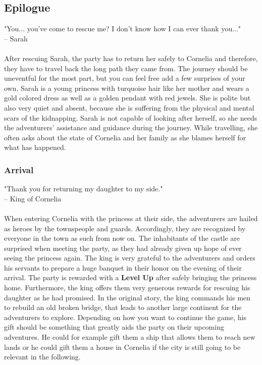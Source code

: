 \subsection*{Epilogue}
"You... you've come to rescue me? I don't know how I can ever thank you..." \\ 
\indent -- Sarah \\\\ 
After rescuing Sarah, the party has to return her safely to Cornelia and therefore, they have to travel back the long path they came from.
The journey should be uneventful for the most part, but you can feel free add a few surprises of your own.
Sarah is a young princess with turquoise hair like her mother and wears a gold colored dress as well as a golden pendant with red jewels.
She is polite but also very quiet and absent, because she is suffering from the physical and mental scars of the kidnapping.
Sarah is not capable of looking after herself, so she needs the adventurers' assistance and guidance during the journey.
While travelling, she often asks about the state of Cornelia and her family as she blames herself for what has happened.

\subsubsection*{Arrival}
"Thank you for returning my daughter to my side." \\ 
\indent -- King of Cornelia \\\\ 
When entering Cornelia with the princess at their side, the adventurers are hailed as heroes by the townspeople and guards.
Accordingly, they are recognized by everyone in the town as such from now on. 
The inhabitants of the castle are surprised when meeting the party, as they had already given up hope of ever seeing the princess again.
The king is very grateful to the adventurers and orders his servants to prepare a huge banquet in their honor on the evening of their arrival.
The party is rewarded with a \textbf{Level Up} after safely bringing the princess home.
Furthermore, the king offers them very generous rewards for rescuing his daughter as he had promised.
In the original story, the king commands his men to rebuild an old broken bridge, that leads to another large continent for the adventurers to explore.
Depending on how you want to continue the game, his gift should be something that greatly aids the party on their upcoming adventures.
He could for example gift them a ship that allows them to reach new lands or he could gift them a house in Cornelia if the city is still going to be relevant in the following.

